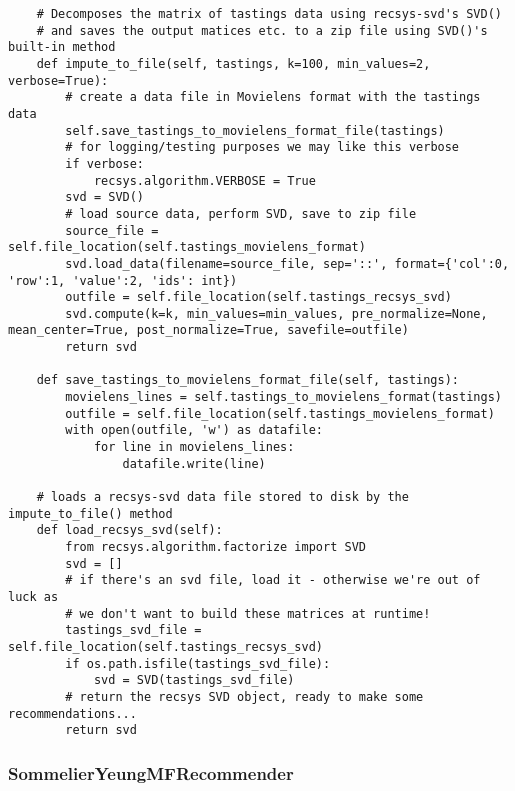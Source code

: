 \begin{verbatim}
    # Decomposes the matrix of tastings data using recsys-svd's SVD()
    # and saves the output matices etc. to a zip file using SVD()'s built-in method
    def impute_to_file(self, tastings, k=100, min_values=2, verbose=True):
        # create a data file in Movielens format with the tastings data
        self.save_tastings_to_movielens_format_file(tastings)
        # for logging/testing purposes we may like this verbose
        if verbose:
            recsys.algorithm.VERBOSE = True
        svd = SVD()
        # load source data, perform SVD, save to zip file
        source_file = self.file_location(self.tastings_movielens_format)
        svd.load_data(filename=source_file, sep='::', format={'col':0, 'row':1, 'value':2, 'ids': int})
        outfile = self.file_location(self.tastings_recsys_svd)
        svd.compute(k=k, min_values=min_values, pre_normalize=None, mean_center=True, post_normalize=True, savefile=outfile)
        return svd

    def save_tastings_to_movielens_format_file(self, tastings):
        movielens_lines = self.tastings_to_movielens_format(tastings)
        outfile = self.file_location(self.tastings_movielens_format)
        with open(outfile, 'w') as datafile:
            for line in movielens_lines:
                datafile.write(line)

    # loads a recsys-svd data file stored to disk by the impute_to_file() method
    def load_recsys_svd(self):
        from recsys.algorithm.factorize import SVD
        svd = []
        # if there's an svd file, load it - otherwise we're out of luck as
        # we don't want to build these matrices at runtime!
        tastings_svd_file = self.file_location(self.tastings_recsys_svd)
        if os.path.isfile(tastings_svd_file):
            svd = SVD(tastings_svd_file)
        # return the recsys SVD object, ready to make some recommendations...
        return svd
\end{verbatim}

\subsubsection{SommelierYeungMFRecommender} \label{app:yeungmf}

